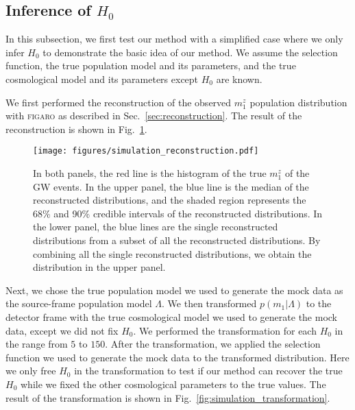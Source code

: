 \documentclass[twocolumn]{aastex631}
\begin{document}
\subsection{Inference of $H_0$}
\label{sec:inference_H0}

In this subsection, we first test our method with a simplified case where we only infer $H_0$ to demonstrate the basic idea of our method.
We assume the selection function, the true population model and its parameters, and the true cosmological model and its parameters except $H_0$ are known.

We first performed the reconstruction of the observed $m^z_1$ population distribution with \textsc{figaro} as described in Sec.~\ref{sec:reconstruction}.
The result of the reconstruction is shown in Fig.~\ref{fig:simulation_reconstruction}.

\begin{figure}[h]
    \texttt{[image: figures/simulation\_reconstruction.pdf]}
    \caption{
        In both panels, the red line is the histogram of the true $m^z_1$ of the \ac{GW} events.
        In the upper panel, the blue line is the median of the reconstructed distributions, and the shaded region represents the 68\% and 90\% credible intervals of the reconstructed distributions.
        In the lower panel, the blue lines are the single reconstructed distributions from a subset of all the reconstructed distributions.
        By combining all the single reconstructed distributions, we obtain the distribution in the upper panel.
    }
    \label{fig:simulation_reconstruction}
\end{figure}

Next, we chose the true population model we used to generate the mock data as the source-frame population model $\Lambda$.
We then transformed $p(m_1|\Lambda)$ to the detector frame with the true cosmological model we used to generate the mock data, except we did not fix $H_0$.
We performed the transformation for each $H_0$ in the range from $5$ to $150$.
After the transformation, we applied the selection function we used to generate the mock data to the transformed distribution.
Here we only free $H_0$ in the transformation to test if our method can recover the true $H_0$ while we fixed the other cosmological parameters to the true values.
The result of the transformation is shown in Fig.~\ref{fig:simulation_transformation}.
\end{document}
